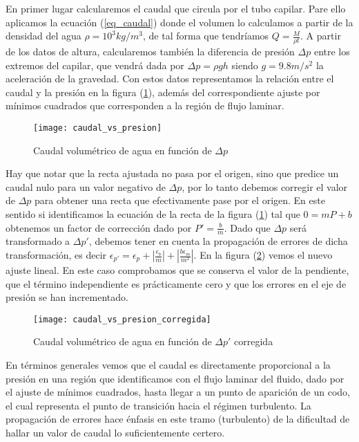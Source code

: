 En primer lugar calcularemos el caudal que circula por el tubo capilar. Pare ello aplicamos la ecuación (\ref{eq_caudal}) donde el volumen lo calculamos a partir de la densidad del agua $\rho = 10^3 kg/m^3$, de tal forma que tendríamos $Q = \frac{M}{\rho t}$. A partir de los datos de altura, calcularemos también la diferencia de presión $\Delta p$ entre los extremos del capilar, que vendrá dada por $\Delta p = \rho gh$ siendo $g = 9.8 m/s^2$ la aceleración de la gravedad. Con estos datos representamos la relación entre el caudal y la presión en la figura (\ref{figure_caudal}), además del correspondiente ajuste por mínimos cuadrados que corresponden a la región de flujo laminar.

\begin{figure}[t]
	\texttt{[image: caudal\_vs\_presion]}
	\caption{Caudal volumétrico de agua en función de $\Delta p$}
	\label{figure_caudal}
\end{figure}

Hay que notar que la recta ajustada no pasa por el origen, sino que predice un caudal nulo para un valor negativo de $\Delta p$, por lo tanto debemos corregir el valor de $\Delta p$ para obtener una recta que efectivamente pase por el origen. En este sentido si identificamos la ecuación de la recta de la figura (\ref{figure_caudal}) tal que $0 = mP+b$ obtenemos un factor de corrección dado por $P' = \frac{b}{m}$. Dado que $\Delta p$ será transformado a $\Delta p'$, debemos tener en cuenta la propagación de errores de dicha transformación, es decir $\epsilon_{p'} = \epsilon_{p} + |\frac{\epsilon_{b}}{m}| + |\frac{b\epsilon_{m}}{m^2}|$. En la figura (\ref{figure_caudal_corregida}) vemos el nuevo ajuste lineal. En este caso comprobamos que se conserva el valor de la pendiente, que el término independiente es prácticamente cero y que los errores en el eje de presión se han incrementado.

\begin{figure}[t]
	\texttt{[image: caudal\_vs\_presion\_corregida]}
	\caption{Caudal volumétrico de agua en función de $\Delta p'$ corregida}
	\label{figure_caudal_corregida}
\end{figure}

En términos generales vemos que el caudal es directamente proporcional a la presión en una región que identificamos con el flujo laminar del fluido, dado por el ajuste de mínimos cuadrados, hasta llegar a un punto de aparición de un codo, el cual representa el punto de transición hacia el régimen turbulento. La propagación de errores hace énfasis en este tramo (turbulento) de la dificultad de hallar un valor de caudal lo suficientemente certero.

